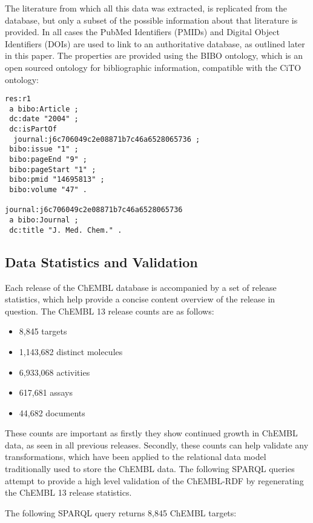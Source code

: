 \documentclass[10pt]{bmc_article}
\newenvironment{bmcformat}{\begin{raggedright}\baselineskip20pt\sloppy\setboolean{publ}{false}}{\end{raggedright}\baselineskip20pt\sloppy}
\begin{document}
\begin{bmcformat}
The literature from which all this data was extracted, is replicated from the database,
but only a subset of the possible information about that literature is provided. In all cases 
the PubMed Identifiers (PMIDs) and Digital Object Identifiers (DOIs) are used to link
to an authoritative database, as outlined later in this paper.
The properties are provided using the BIBO ontology, which is an open sourced ontology
for bibliographic information, compatible with the CiTO ontology:

\begin{small}
\begin{verbatim}
res:r1
 a bibo:Article ;
 dc:date "2004" ;
 dc:isPartOf
  journal:j6c706049c2e08871b7c46a6528065736 ;
 bibo:issue "1" ;
 bibo:pageEnd "9" ;
 bibo:pageStart "1" ;
 bibo:pmid "14695813" ;
 bibo:volume "47" .

journal:j6c706049c2e08871b7c46a6528065736
 a bibo:Journal ;
 dc:title "J. Med. Chem." .
\end{verbatim}
\end{small}

\subsection*{Data Statistics and Validation}

Each release of the ChEMBL database is accompanied by a set of release statistics, which help 
provide a concise content overview of the release in question. The ChEMBL 13 release counts
are as follows:
\begin{itemize}
  \item 8,845 targets
  \item 1,143,682 distinct molecules
  \item 6,933,068 activities
  \item 617,681 assays
  \item 44,682 documents
\end{itemize}

These counts are important as firstly they show continued growth in ChEMBL data, as seen 
in all previous releases. Secondly, these counts can help validate any transformations, 
which have been applied to the relational data model traditionally used to store the ChEMBL 
data.  The following SPARQL queries attempt to provide a high level validation of the 
ChEMBL-RDF by regenerating the ChEMBL 13 release statistics.

The following SPARQL query returns 8,845 ChEMBL targets:
     

\end{bmcformat}
\end{document}
